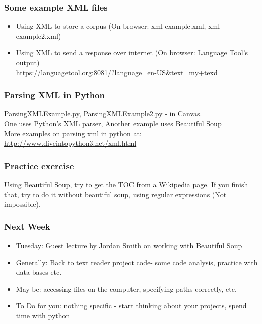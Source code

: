 \documentclass{beamer}
\begin{document}
\begin{frame}
\frametitle{Some example XML files}
\begin{itemize}
\item Using XML to store a corpus (On browser: xml-example.xml, xml-example2.xml)
\item Using XML to send a response over internet (On browser: Language Tool's output) \\ \url{https://languagetool.org:8081/?language=en-US&text=my+texd}
\end{itemize}
\end{frame}

\begin{frame}
\frametitle{Parsing XML in Python}
ParsingXMLExample.py, ParsingXMLExample2.py - in Canvas.
\\ One uses Python's XML parser, Another example uses Beautiful Soup
\\ More examples on parsing xml in python at: \url{http://www.diveintopython3.net/xml.html}
\end{frame}

\begin{frame}
\frametitle{Practice exercise}
Using Beautiful Soup, try to get the TOC from a Wikipedia page. If you finish that, try to do it without beautiful soup, using regular expressions (Not impossible).
\end{frame}


\begin{frame}
\frametitle{Next Week}
\begin{itemize}
\item Tuesday: Guest lecture by Jordan Smith on working with Beautiful Soup 
\item Generally: Back to text reader project code- some code analysis, practice with data bases etc.
\item May be: accessing files on the computer, specifying paths correctly, etc.
\item To Do for you: nothing specific - start thinking about your projects, spend time with python
\end{itemize}
\end{frame}
\end{document}
